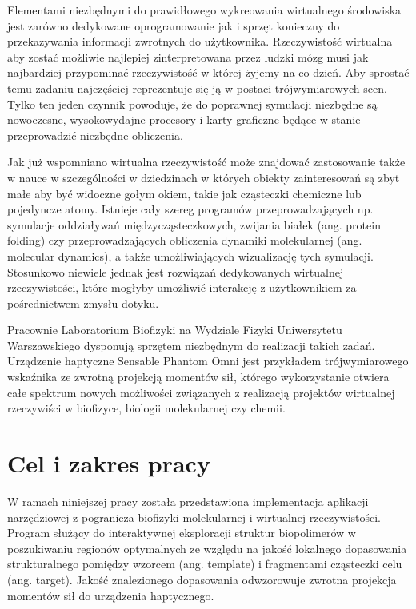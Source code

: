 \documentclass[licencjacka]{pracamgr}
\begin{document}
Elementami niezbędnymi do prawidłowego wykreowania wirtualnego środowiska jest zarówno dedykowane oprogramowanie jak i sprzęt konieczny do przekazywania informacji zwrotnych do użytkownika. Rzeczywistość wirtualna aby zostać możliwie najlepiej zinterpretowana przez ludzki mózg musi jak najbardziej przypominać rzeczywistość w której żyjemy na co dzień. Aby sprostać temu zadaniu najczęściej reprezentuje się ją w postaci trójwymiarowych scen. Tylko ten jeden czynnik powoduje, że do poprawnej symulacji niezbędne są nowoczesne, wysokowydajne procesory i karty graficzne będące w stanie przeprowadzić niezbędne obliczenia.

Jak już wspomniano wirtualna rzeczywistość może znajdować zastosowanie także w nauce w szczególności w dziedzinach w których obiekty zainteresowań są zbyt małe aby być widoczne gołym okiem, takie jak cząsteczki chemiczne lub pojedyncze atomy. Istnieje cały szereg programów przeprowadzających np. symulacje oddziaływań międzycząsteczkowych, zwijania białek (ang. protein folding) czy przeprowadzających obliczenia dynamiki molekularnej (ang. molecular dynamics), a także umożliwiających wizualizację tych symulacji. Stosunkowo niewiele jednak jest rozwiązań dedykowanych wirtualnej rzeczywistości, które mogłyby umożliwić interakcję z użytkownikiem za pośrednictwem zmysłu dotyku. 
	
Pracownie Laboratorium Biofizyki na Wydziale Fizyki Uniwersytetu Warszawskiego dysponują sprzętem niezbędnym do realizacji takich zadań. Urządzenie haptyczne Sensable Phantom Omni jest przykładem trójwymiarowego wskaźnika ze zwrotną projekcją momentów sił, którego wykorzystanie otwiera całe spektrum nowych możliwości związanych z realizacją projektów wirtualnej rzeczywiści w biofizyce, biologii molekularnej czy chemii. 

\chapter*{Cel i zakres pracy}

W ramach niniejszej pracy została przedstawiona implementacja aplikacji narzędziowej z pogranicza biofizyki molekularnej i wirtualnej rzeczywistości. Program służący do interaktywnej eksploracji struktur biopolimerów w poszukiwaniu regionów optymalnych ze względu na jakość lokalnego dopasowania strukturalnego pomiędzy wzorcem (ang. template) i fragmentami cząsteczki celu (ang. target). Jakość znalezionego dopasowania odwzorowuje zwrotna projekcja momentów sił do urządzenia haptycznego. 
	
\end{document}
